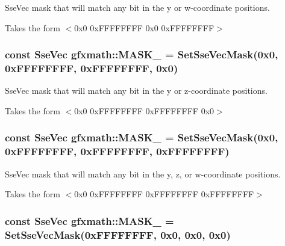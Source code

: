 Sse\+Vec mask that will match any bit in the y or w-\/coordinate positions. 

Takes the form $<$0x0 0x\+F\+F\+F\+F\+F\+F\+F\+F 0x0 0x\+F\+F\+F\+F\+F\+F\+F\+F$>$ \hypertarget{namespacegfxmath_a0a4b2297562ec2a6515260a20caca407}{}
\subsubsection[{M\+A\+S\+K\+\_\+0110}]{\setlength{\rightskip}{0pt plus 5cm}const {\bf Sse\+Vec} gfxmath\+::\+M\+A\+S\+K\+\_ = {\bf Set\+Sse\+Vec\+Mask}(0x0, 0x\+F\+F\+F\+F\+F\+F\+F\+F, 0x\+F\+F\+F\+F\+F\+F\+F\+F, 0x0)}\label{namespacegfxmath_a0a4b2297562ec2a6515260a20caca407}


Sse\+Vec mask that will match any bit in the y or z-\/coordinate positions. 

Takes the form $<$0x0 0x\+F\+F\+F\+F\+F\+F\+F\+F 0x\+F\+F\+F\+F\+F\+F\+F\+F 0x0$>$ \hypertarget{namespacegfxmath_af0b3d0d404066d8571a0a5b3ac58c76d}{}
\subsubsection[{M\+A\+S\+K\+\_\+0111}]{\setlength{\rightskip}{0pt plus 5cm}const {\bf Sse\+Vec} gfxmath\+::\+M\+A\+S\+K\+\_ = {\bf Set\+Sse\+Vec\+Mask}(0x0, 0x\+F\+F\+F\+F\+F\+F\+F\+F, 0x\+F\+F\+F\+F\+F\+F\+F\+F, 0x\+F\+F\+F\+F\+F\+F\+F\+F)}\label{namespacegfxmath_af0b3d0d404066d8571a0a5b3ac58c76d}


Sse\+Vec mask that will match any bit in the y, z, or w-\/coordinate positions. 

Takes the form $<$0x0 0x\+F\+F\+F\+F\+F\+F\+F\+F 0x\+F\+F\+F\+F\+F\+F\+F\+F 0x\+F\+F\+F\+F\+F\+F\+F\+F$>$ \hypertarget{namespacegfxmath_a10283405fa4ee9c652e68cd952034937}{}
\subsubsection[{M\+A\+S\+K\+\_\+1000}]{\setlength{\rightskip}{0pt plus 5cm}const {\bf Sse\+Vec} gfxmath\+::\+M\+A\+S\+K\+\_ = {\bf Set\+Sse\+Vec\+Mask}(0x\+F\+F\+F\+F\+F\+F\+F\+F, 0x0, 0x0, 0x0)}\label{namespacegfxmath_a10283405fa4ee9c652e68cd952034937}


